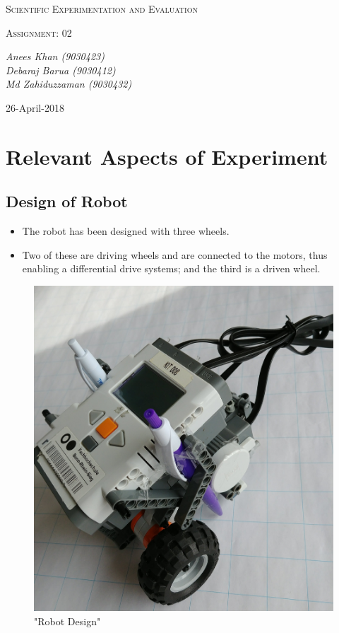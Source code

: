 \documentclass[10pt,a4paper]{article}
\begin{document}
	\begin{titlepage}
	\centering

		{\scshape\LARGE Scientific Experimentation and Evaluation\par}

		{\scshape\Large Assignment: 02\par}

		\vfill

		\vfill
		{\Large\itshape Anees Khan (9030423)
			\\Debaraj Barua (9030412)\\
			Md Zahiduzzaman (9030432)
			\par}
		\vfill

		{\large 26-April-2018\par}
	\end{titlepage}
	\tableofcontents
	\section{Relevant Aspects of Experiment}
	\subsection{Design of Robot}
		\begin{itemize}
			\item The robot has been designed with three wheels.
			\item Two of these are driving wheels and are connected to the motors, thus enabling a differential drive systems; and the third is a driven wheel.
		\end{itemize}
		\begin{figure}[h]
			\caption{"Robot Design"}
			\includegraphics[scale=0.1]{bot.jpg}
		\end{figure}
\end{document}
